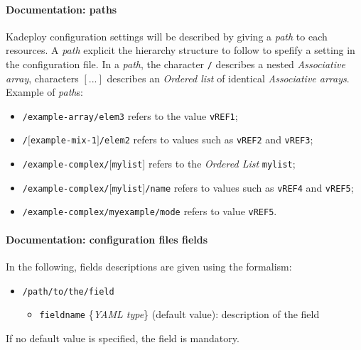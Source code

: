 \documentclass[a4wide,10pt,oneside]{book}
\newcommand{\ypath}[1]{\texttt{#1}}
\newcommand{\yfieldd}[3]{\texttt{#1} {\small\{{\emph{#2}}\}} {\small(}#3{\small)}:}
\begin{document}
\paragraph{Documentation: paths\\}
Kadeploy configuration settings will be described by giving a \emph{path} to each resources. A \emph{path} explicit the hierarchy structure to follow to spefify a setting in the configuration file. In a \emph{path}, the character \texttt{/} describes a nested \emph{Associative array}, characters \texttt{$[...]$} describes an \emph{Ordered list} of identical \emph{Associative arrays}.\\

Example of \emph{path}s:
\begin{itemize}
  \item \texttt{\small /example-array/elem3} refers to the value \texttt{\small vREF1};
  \item \texttt{\small /$[$example-mix-1$]$/elem2} refers to values such as \texttt{\small vREF2} and \texttt{\small vREF3};
  \item \texttt{\small /example-complex/$[$mylist$]$} refers to the \emph{Ordered List} \texttt{\small mylist};
  \item \texttt{\small /example-complex/$[$mylist$]$/name} refers to values such as \texttt{\small vREF4} and \texttt{\small vREF5};
  \item \texttt{\small /example-complex/myexample/mode} refers to value \texttt{\small vREF5}.
\end{itemize}

\paragraph{Documentation: configuration files fields\\}
In the following, fields descriptions are given using the formalism:
\begin{itemize}
  \item \ypath{/path/to/the/field}
  \begin{itemize}
    \item \yfieldd{fieldname}{YAML type}{default value} description of the field
  \end{itemize}
\end{itemize}
If no default value is specified, the field is mandatory.
\end{document}
